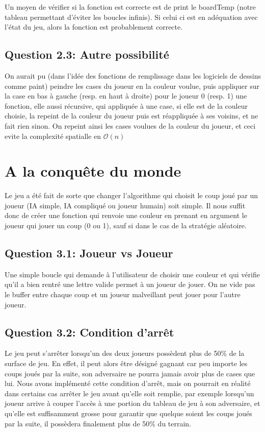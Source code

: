 \documentclass{article}
\begin{document}
    Un moyen de vérifier si la fonction est correcte est de print le boardTemp (notre tableau permettant d'éviter les boucles infinis). Si celui ci est en adéquation avec l'état du jeu, alors la fonction est probablement correcte.

    \subsection*{Question 2.3: Autre possibilité}
    On aurait pu (dans l'idée des fonctions de remplissage dans les logiciels de dessins comme paint) peindre les cases du joueur en la couleur voulue, puis appliquer sur la case en bas à gauche (resp. en haut à droite) pour le joueur 0 (resp. 1) une fonction, elle aussi récursive, qui appliquée à une case, si elle est de la couleur choisie, la repeint de la couleur du joueur puis est réappliquée à ses voisins, et ne fait rien sinon. On repeint ainsi les cases voulues de la couleur du joueur, et ceci evite la complexité spatialle en $\mathcal{O}(n)$

    \section{A la conquête du monde}

    Le jeu a été fait de sorte que changer l'algorithme qui choisit le coup joué par un joueur (IA simple, IA compliqué ou joueur humain) soit simple. Il nous suffit donc de créer une fonction qui renvoie une couleur en prenant en argument le joueur qui jouer un coup (0 ou 1), sauf si dans le cas de la stratégie aléatoire.

    \subsection*{Question 3.1: Joueur vs Joueur}

    Une simple boucle qui demande à l'utilisateur de choisir une couleur et qui vérifie qu'il a bien rentré une lettre valide permet à un joueur de jouer. On ne vide pas le buffer entre chaque coup et un joueur malveillant peut jouer pour l'autre joueur.

    \subsection*{Question 3.2: Condition d'arrêt}

    Le jeu peut s'arrêter lorsqu'un des deux joueurs possèdent plus de 50\% de la surface de jeu. En effet, il peut alors être désigné gagnant car peu importe les coups joués par la suite, son adversaire ne pourra jamais avoir plus de cases que lui. Nous avons implémenté cette condition d'arrêt, mais on pourrait en réalité dans certains cas arrêter le jeu avant qu'elle soit remplie, par exemple lorsqu'un joueur arrive à couper l'accès à une portion du tableau de jeu à son adversaire, et qu'elle est suffisamment grosse pour garantir que quelque soient les coups joués par la suite, il possèdera finalement plus de 50\% du terrain.
\end{document}
